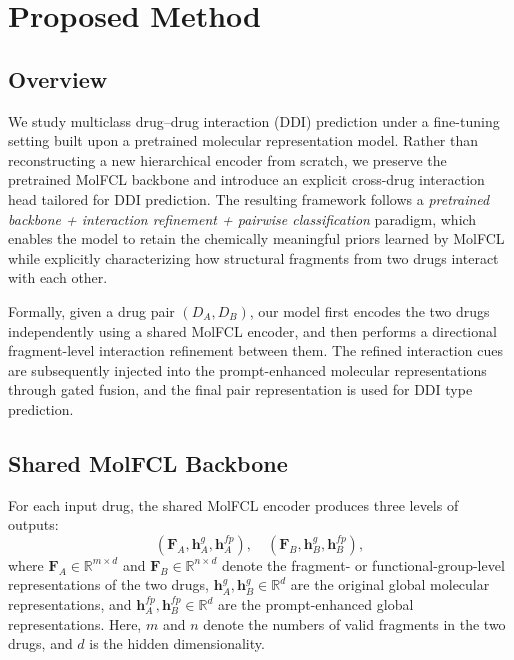 \section{Proposed Method}
\label{sec:method}

\subsection{Overview}

We study multiclass drug--drug interaction (DDI) prediction under a fine-tuning setting built upon a pretrained molecular representation model. Rather than reconstructing a new hierarchical encoder from scratch, we preserve the pretrained MolFCL backbone and introduce an explicit cross-drug interaction head tailored for DDI prediction. The resulting framework follows a \emph{pretrained backbone + interaction refinement + pairwise classification} paradigm, which enables the model to retain the chemically meaningful priors learned by MolFCL while explicitly characterizing how structural fragments from two drugs interact with each other.

Formally, given a drug pair $(D_A, D_B)$, our model first encodes the two drugs independently using a shared MolFCL encoder, and then performs a directional fragment-level interaction refinement between them. The refined interaction cues are subsequently injected into the prompt-enhanced molecular representations through gated fusion, and the final pair representation is used for DDI type prediction.

\subsection{Shared MolFCL Backbone}

For each input drug, the shared MolFCL encoder produces three levels of outputs:
\begin{equation}
(\mathbf{F}_A, \mathbf{h}^{g}_A, \mathbf{h}^{fp}_A), \quad
(\mathbf{F}_B, \mathbf{h}^{g}_B, \mathbf{h}^{fp}_B),
\end{equation}
where $\mathbf{F}_A \in \mathbb{R}^{m \times d}$ and $\mathbf{F}_B \in \mathbb{R}^{n \times d}$ denote the fragment- or functional-group-level representations of the two drugs, $\mathbf{h}^{g}_A, \mathbf{h}^{g}_B \in \mathbb{R}^{d}$ are the original global molecular representations, and $\mathbf{h}^{fp}_A, \mathbf{h}^{fp}_B \in \mathbb{R}^{d}$ are the prompt-enhanced global representations. Here, $m$ and $n$ denote the numbers of valid fragments in the two drugs, and $d$ is the hidden dimensionality.


